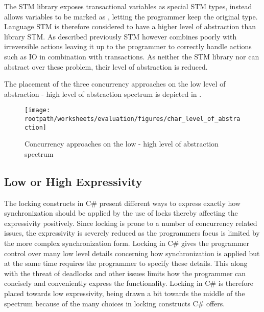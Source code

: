 The \ac{STM} library exposes transactional variables as special \ac{STM} types, \stmnamesp instead allows variables to be marked as , letting the programmer keep the original type. Language \ac{STM} is therefore considered to have a higher level of abstraction than library \ac{STM}. As described previously \ac{STM} however combines poorly with irreversible actions leaving it up to the programmer to correctly handle actions such as \ac{IO} in combination with transactions. As neither the \ac{STM} library nor \stmnamesp can abstract over these problem, their level of abstraction is reduced.

The placement of the three concurrency approaches on the low level of abstraction - high level of abstraction spectrum is depicted in . 

\begin{figure}[htbp]
\centering
 \texttt{[image: \\rootpath/worksheets/evaluation/figures/char\_level\_of\_abstraction]} 
 \caption{Concurrency approaches on the low - high level of abstraction spectrum}
\label{fig:char_level_of_abstraction}
\end{figure}

\subsection{Low or High Expressivity}\label{subsec:expressivity}
The locking constructs in C\# present different ways to express exactly how synchronization should be applied by the use of locks thereby affecting the expressivity positively. Since locking is prone to a number of concurrency related issues, the expressivity is severely reduced as the programmers focus is limited by the more complex synchronization form. Locking in C\# gives the programmer control over many low level details concerning how synchronization is applied but at the same time requires the programmer to specify these details. This along with the threat of deadlocks and other issues limits how the programmer can concisely and conveniently express the functionality. Locking in C\# is therefore placed towards low expressivity, being drawn a bit towards the middle of the spectrum because of the many choices in locking constructs C\# offers.

